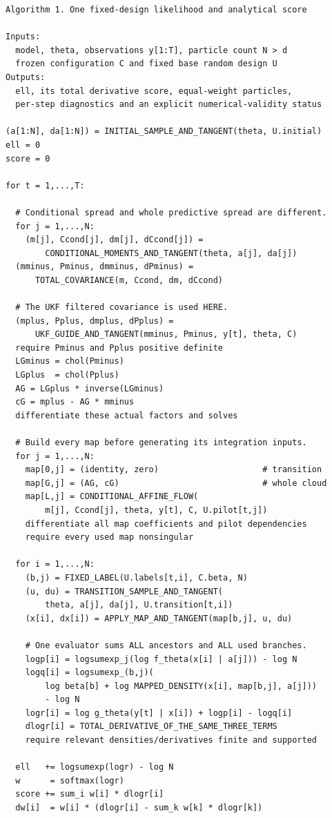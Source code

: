 \documentclass[11pt,a4paper]{article}
\begin{document}
\begin{lstlisting}
Algorithm 1. One fixed-design likelihood and analytical score

Inputs:
  model, theta, observations y[1:T], particle count N > d
  frozen configuration C and fixed base random design U
Outputs:
  ell, its total derivative score, equal-weight particles,
  per-step diagnostics and an explicit numerical-validity status

(a[1:N], da[1:N]) = INITIAL_SAMPLE_AND_TANGENT(theta, U.initial)
ell = 0
score = 0

for t = 1,...,T:

  # Conditional spread and whole predictive spread are different.
  for j = 1,...,N:
    (m[j], Ccond[j], dm[j], dCcond[j]) =
        CONDITIONAL_MOMENTS_AND_TANGENT(theta, a[j], da[j])
  (mminus, Pminus, dmminus, dPminus) =
      TOTAL_COVARIANCE(m, Ccond, dm, dCcond)

  # The UKF filtered covariance is used HERE.
  (mplus, Pplus, dmplus, dPplus) =
      UKF_GUIDE_AND_TANGENT(mminus, Pminus, y[t], theta, C)
  require Pminus and Pplus positive definite
  LGminus = chol(Pminus)
  LGplus  = chol(Pplus)
  AG = LGplus * inverse(LGminus)
  cG = mplus - AG * mminus
  differentiate these actual factors and solves

  # Build every map before generating its integration inputs.
  for j = 1,...,N:
    map[0,j] = (identity, zero)                     # transition
    map[G,j] = (AG, cG)                             # whole cloud
    map[L,j] = CONDITIONAL_AFFINE_FLOW(
        m[j], Ccond[j], theta, y[t], C, U.pilot[t,j])
    differentiate all map coefficients and pilot dependencies
    require every used map nonsingular

  for i = 1,...,N:
    (b,j) = FIXED_LABEL(U.labels[t,i], C.beta, N)
    (u, du) = TRANSITION_SAMPLE_AND_TANGENT(
        theta, a[j], da[j], U.transition[t,i])
    (x[i], dx[i]) = APPLY_MAP_AND_TANGENT(map[b,j], u, du)

    # One evaluator sums ALL ancestors and ALL used branches.
    logp[i] = logsumexp_j(log f_theta(x[i] | a[j])) - log N
    logq[i] = logsumexp_(b,j)(
        log beta[b] + log MAPPED_DENSITY(x[i], map[b,j], a[j]))
        - log N
    logr[i] = log g_theta(y[t] | x[i]) + logp[i] - logq[i]
    dlogr[i] = TOTAL_DERIVATIVE_OF_THE_SAME_THREE_TERMS
    require relevant densities/derivatives finite and supported

  ell   += logsumexp(logr) - log N
  w      = softmax(logr)
  score += sum_i w[i] * dlogr[i]
  dw[i]  = w[i] * (dlogr[i] - sum_k w[k] * dlogr[k])


\end{lstlisting}
\end{document}
